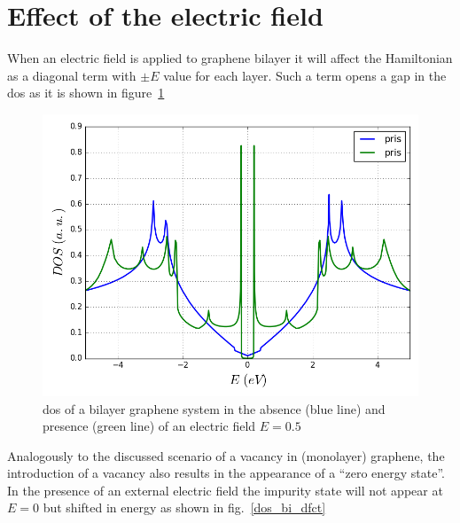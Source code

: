  \section{Effect of the electric field}
 When an electric field is applied to graphene bilayer it will affect the Hamiltonian as a diagonal term with $\pm E$ value for each layer. Such a term opens a gap in the \ac{dos} as it is shown in figure~\ref{bi_Efield}

\begin{figure}[h!]
  \centering
  \includegraphics{chapter06/figures/bilayer_dos_E.png}
  \vspace{-5pt}
  \caption{\ac{dos} of a bilayer graphene system in the absence (blue line) and presence (green line) of an electric field $E=0.5$} %
  \label{bi_Efield}
\end{figure}
\FloatBarrier

Analogously to the discussed scenario of a vacancy in (monolayer) graphene, the introduction of a vacancy also results in the appearance of a ``zero energy state''. In the presence of an external electric field the impurity state will not appear at $E=0$ but shifted in energy as shown in fig.~\ref{dos_bi_dfct}

